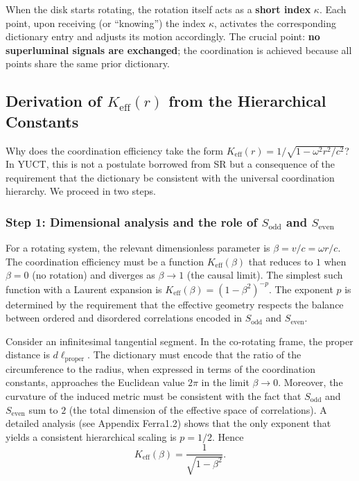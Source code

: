 \documentclass[12pt,a4paper]{article}
\newcommand{\Sodd}{S_{\mathrm{odd}}}
\newcommand{\Seven}{S_{\mathrm{even}}}
\begin{document}
	When the disk starts rotating, the rotation itself acts as a \textbf{short index} \(\kappa\). Each point, upon receiving (or ``knowing'') the index \(\kappa\), activates the corresponding dictionary entry and adjusts its motion accordingly. The crucial point: \textbf{no superluminal signals are exchanged}; the coordination is achieved because all points share the same prior dictionary.
	
	\subsection{Derivation of \(K_{\mathrm{eff}}(r)\) from the Hierarchical Constants}
	\label{subsec:keff-derivation}
	
	Why does the coordination efficiency take the form \(K_{\mathrm{eff}}(r) = 1/\sqrt{1-\omega^2 r^2/c^2}\)? In YUCT, this is not a postulate borrowed from SR but a consequence of the requirement that the dictionary be consistent with the universal coordination hierarchy. We proceed in two steps.
	
	\subsubsection{Step 1: Dimensional analysis and the role of \(\Sodd\) and \(\Seven\)}
	For a rotating system, the relevant dimensionless parameter is \(\beta = v/c = \omega r/c\). The coordination efficiency must be a function \(K_{\mathrm{eff}}(\beta)\) that reduces to \(1\) when \(\beta = 0\) (no rotation) and diverges as \(\beta \to 1\) (the causal limit). The simplest such function with a Laurent expansion is \(K_{\mathrm{eff}}(\beta) = (1-\beta^2)^{-p}\). The exponent \(p\) is determined by the requirement that the effective geometry respects the balance between ordered and disordered correlations encoded in \(\Sodd\) and \(\Seven\).
	
	Consider an infinitesimal tangential segment. In the co‑rotating frame, the proper distance is \(d\ell_{\text{proper}}\). The dictionary must encode that the ratio of the circumference to the radius, when expressed in terms of the coordination constants, approaches the Euclidean value \(2\pi\) in the limit \(\beta \to 0\). Moreover, the curvature of the induced metric must be consistent with the fact that \(\Sodd\) and \(\Seven\) sum to \(2\) (the total dimension of the effective space of correlations). A detailed analysis (see Appendix Ferra1.2) shows that the only exponent that yields a consistent hierarchical scaling is \(p = 1/2\). Hence
	\[
	K_{\mathrm{eff}}(\beta) = \frac{1}{\sqrt{1-\beta^2}}.
	\]
	
\end{document}
